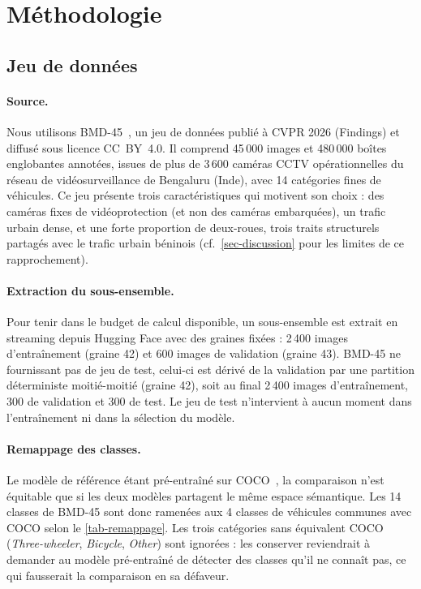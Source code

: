 \section{Méthodologie}\label{sec-methode}

\subsection{Jeu de données}\label{sec-donnees}

\paragraph{Source.}
Nous utilisons BMD-45~\cite{sharma2026bmd45}, un jeu de données publié à
CVPR 2026 (Findings) et diffusé sous licence CC~BY~4.0. Il comprend
45\,000 images et 480\,000 boîtes englobantes annotées, issues de plus de
3\,600 caméras CCTV opérationnelles du réseau de vidéosurveillance de
Bengaluru (Inde), avec 14 catégories fines de véhicules. Ce jeu présente
trois caractéristiques qui motivent son choix : des caméras fixes de
vidéoprotection (et non des caméras embarquées), un trafic urbain dense,
et une forte proportion de deux-roues, trois traits structurels partagés
avec le trafic urbain béninois (cf.~\cref{sec-discussion} pour les limites
de ce rapprochement).

\paragraph{Extraction du sous-ensemble.}
Pour tenir dans le budget de calcul disponible, un sous-ensemble est
extrait en streaming depuis Hugging Face avec des graines fixées :
2\,400 images d'entraînement (graine 42) et 600 images de validation
(graine 43). BMD-45 ne fournissant pas de jeu de test, celui-ci est dérivé
de la validation par une partition déterministe moitié-moitié (graine 42),
soit au final 2\,400 images d'entraînement, 300 de validation et 300 de
test. Le jeu de test n'intervient à aucun moment dans l'entraînement ni
dans la sélection du modèle.

\paragraph{Remappage des classes.}
Le modèle de référence étant pré-entraîné sur COCO~\cite{lin2014coco},
la comparaison n'est équitable que si les deux modèles partagent le même
espace sémantique. Les 14 classes de BMD-45 sont donc ramenées aux
4 classes de véhicules communes avec COCO selon le
\cref{tab-remappage}. Les trois catégories sans équivalent COCO
(\emph{Three-wheeler}, \emph{Bicycle}, \emph{Other}) sont ignorées :
les conserver reviendrait à demander au modèle pré-entraîné de détecter
des classes qu'il ne connaît pas, ce qui fausserait la comparaison en sa
défaveur.

